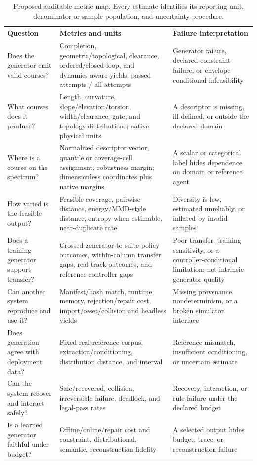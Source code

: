 \begin{table}[t]
  \centering
  \caption{Proposed auditable metric map. Every estimate identifies its reporting
  unit, denominator or sample population, and uncertainty procedure.}
  \label{tab:metric-map}
  \footnotesize
  \begin{tabularx}{\linewidth}{@{}Y Y Y@{}}
    \toprule
    Question & Metrics and units & Failure interpretation \\
    \midrule
    Does the generator emit valid courses? & Completion, geometric/topological,
    clearance, ordered/closed-loop, and dynamics-aware yields; passed attempts / all
    attempts & Generator failure, declared-constraint failure, or envelope-conditional
    infeasibility \\
    What courses does it produce? & Length, curvature, slope/elevation/torsion,
    width/clearance, gate, and topology distributions; native physical units & A
    descriptor is missing, ill-defined, or outside the declared domain \\
    Where is a course on the spectrum? & Normalized descriptor vector, quantile or
    coverage-cell assignment, robustness margin; dimensionless coordinates plus native
    margins & A scalar or categorical label hides dependence on domain or reference
    agent \\
    How varied is the feasible output? & Feasible coverage, pairwise distance,
    energy/MMD-style distance, entropy when estimable, near-duplicate rate & Diversity
    is low, estimated unreliably, or inflated by invalid samples \\
    Does a training generator support transfer? & Crossed generator-to-suite policy
    outcomes, within-column transfer gaps, real-track outcomes, and
    reference-controller gaps & Poor transfer, training sensitivity, or a
    controller-conditional limitation; not intrinsic generator quality \\
    Can another system reproduce and use it? & Manifest/hash match, runtime,
    memory, rejection/repair cost, import/reset/collision and headless yields & Missing
    provenance, nondeterminism, or a broken simulator interface \\
    Does generation agree with deployment data? & Fixed real-reference corpus,
    extraction/conditioning, distribution distance, and interval & Reference mismatch,
    insufficient conditioning, or uncertain estimate \\
    Can the system recover and interact safely? & Safe/recovered, collision,
    irreversible-failure, deadlock, and legal-pass rates & Recovery, interaction, or
    rule failure under the declared budget \\
    Is a learned generator faithful under budget? & Offline/online/repair cost and
    constraint, distributional, semantic, reconstruction fidelity & A selected output
    hides budget, trace, or reconstruction failure \\
    \bottomrule
  \end{tabularx}
\end{table}

